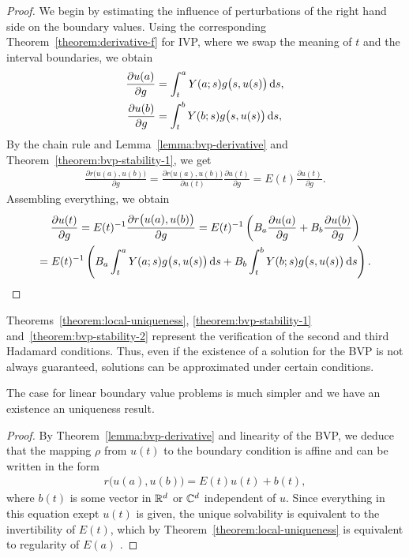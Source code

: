 \begin{proof}
  We begin by estimating the influence of perturbations of the right
  hand side on the boundary values. Using the corresponding
  Theorem~\ref{theorem:derivative-f} for IVP, where we swap the
  meaning of $t$ and the interval boundaries, we obtain
  \begin{align*}
    \frac{\partial u(a)}{\partial g}
    &= \int_t^a \fundamental(a;s) g\bigl(s,u(s)\bigr) \ds,
    \\
    \frac{\partial u(b)}{\partial g}
    &= \int_t^b \fundamental(b;s) g\bigl(s,u(s)\bigr) \ds,
  \end{align*}
  By the chain rule and Lemma~\ref{lemma:bvp-derivative}
  and Theorem~\ref{theorem:bvp-stability-1}, we get
  \begin{gather*}
    \frac{\partial r\bigl(u(a), u(b)\bigr)}{\partial g}
    = \frac{\partial r\bigl(u(a), u(b)\bigr)}{\partial u(t)}
    \frac{\partial u(t)}{\partial g}
    = E(t)\frac{\partial u(t)}{\partial g}.
  \end{gather*}
Assembling everything, we obtain
\begin{multline*}
  \frac{\partial u(t)}{\partial g}
  = E(t)^{-1} \frac{\partial r\bigl(u(a), u(b)\bigr)}{\partial g}
  = E(t)^{-1} \left(
    \rwaa \frac{\partial u(a)}{\partial g}
    + \rwab \frac{\partial u(b)}{\partial g}\right)
  \\
  = E(t)^{-1} \left(
    \rwaa \int_t^a \fundamental(a;s) g\bigl(s,u(s)\bigr) \ds
    + \rwab \int_t^b \fundamental(b;s) g\bigl(s,u(s)\bigr) \ds
    \right).
  \end{multline*}
\end{proof}

\begin{remark}
  Theorems~\ref{theorem:local-uniqueness}, \ref{theorem:bvp-stability-1}
  and~\ref{theorem:bvp-stability-2} represent the verification of the
  second and third Hadamard conditions.
  Thus, even if the existence of a solution for the BVP is not always
  guaranteed, solutions can be approximated under certain conditions.
  
  The case for linear boundary value problems is much simpler and we
  have an existence an uniqueness result.
\end{remark}



\begin{proof}
  By Theorem~\ref{lemma:bvp-derivative} and linearity of the BVP,
  we deduce that the mapping $\rho$ from $u(t)$ to the boundary
  condition is affine and can be written in the form
  \begin{gather*}
    r\bigl(u(a),u(b)\bigr) = E(t) u(t) + b(t),
  \end{gather*}
  where $b(t)$ is some vector in $\mathbb R^d$ or $\mathbb C^d$ independent of
  $u$. Since everything in this equation exept $u(t)$ is given, the
  unique solvability is equivalent to the invertibility of $E(t)$,
  which by Theorem~\ref{theorem:local-uniqueness} is equivalent to
  regularity of $E(a)$ .
\end{proof}


